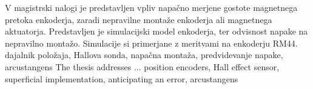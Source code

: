 \documentclass[a4paper,twoside,openright,12pt]{book}
\begin{document}
V magistrski nalogi je predstavljen vpliv napačno merjene gostote magnetnega pretoka enkoderja, zaradi nepravilne montaže enkoderja ali magnetnega aktuatorja. Predstavljen je simulacijski model enkoderja, ter odvisnost napake na nepravilno montažo. Simulacije si primerjane z meritvami na enkoderju RM44.
%
\kljucnebesede  dajalnik položaja, Hallova sonda, napačna montaža, predvidevanje napake, arcustangens
%
%
\abstract
%
The thesis addresses ...
%
\keywords position encoders, Hall effect sensor, superficial implementation, anticipating an error, arcustangens
%
%














\end{document}
